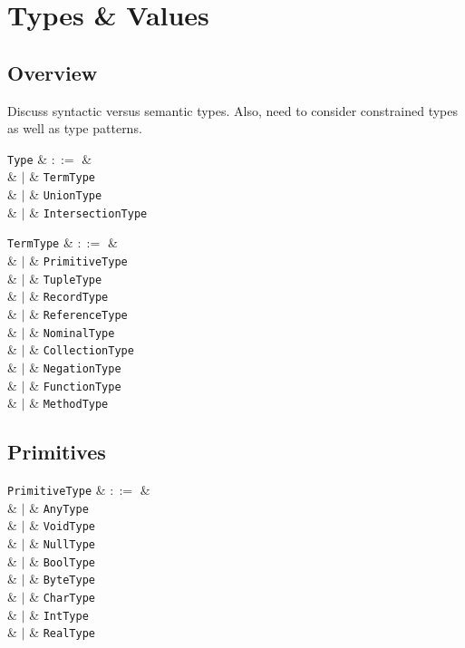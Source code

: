 \chapter{Types \& Values}
\section{Overview}
Discuss syntactic versus semantic types.  Also, need to consider
constrained types as well as type patterns.

\begin{syntax}
  \verb+Type+ & $::=$ & \\
  & $|$ & \verb+TermType+ \\
  & $|$ & \verb+UnionType+ \\
  & $|$ & \verb+IntersectionType+ \\
\end{syntax}

\begin{syntax}
  \verb+TermType+ & $::=$ & \\
  & $|$ & \verb+PrimitiveType+ \\
  & $|$ & \verb+TupleType+ \\
  & $|$ & \verb+RecordType+ \\
  & $|$ & \verb+ReferenceType+ \\
  & $|$ & \verb+NominalType+ \\
  & $|$ & \verb+CollectionType+ \\
  & $|$ & \verb+NegationType+ \\
  & $|$ & \verb+FunctionType+ \\
  & $|$ & \verb+MethodType+ \\
\end{syntax}


\section{Primitives}

\begin{syntax}
  \verb+PrimitiveType+ & $::=$ & \\
  & $|$ & \verb+AnyType+ \\
  & $|$ & \verb+VoidType+ \\
  & $|$ & \verb+NullType+ \\
  & $|$ & \verb+BoolType+ \\
  & $|$ & \verb+ByteType+ \\
  & $|$ & \verb+CharType+ \\
  & $|$ & \verb+IntType+ \\
  & $|$ & \verb+RealType+ \\
\end{syntax}


